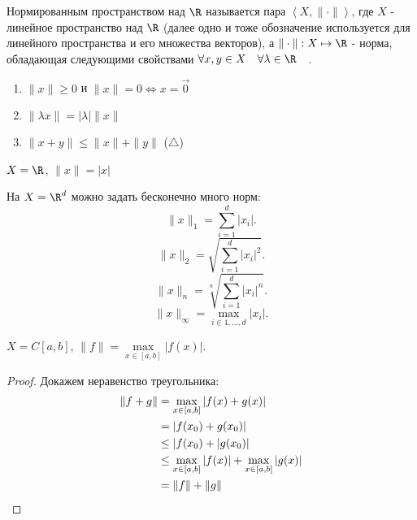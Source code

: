 
\begin{definition} \thmslashn 

    Нормированным пространством над $\R$ называется пара $\left<X, \|\cdot\|\right>$, где $X$ - линейное пространство над $\R$ (далее одно и тоже обозначение используется для линейного пространства и его множества векторов), а $\|\cdot\| : X \mapsto \R$ - норма, обладающая следующими свойствами $\forall{x, y\in X}\quad \forall{\lambda\in \R}\quad $.

    \begin{enumerate}
        \item $\|x\| \ge 0$ и $\|x\| = 0 \iff x = \vec{0}$
        \item $\|\lambda x\| = |\lambda| \|x\|$
        \item $\|x + y\| \le \|x\| + \|y\|$ ($\triangle$)
    \end{enumerate}
\end{definition}
\begin{example} \thmslashn

    $X = \R$,  $\|x\| = |x|$
\end{example}
\begin{example} \thmslashn

    На $X = \R^{d}$ можно задать бесконечно много норм:
    \[ \|x\|_{1} = \sum\limits_{i=1}^{d} |x_{i}| .\]
    \[ \|x\|_{2} = \sqrt{\sum\limits_{i=1}^{d} |x_{i}|^{2}}  .\]
    \[ \|x\|_{n} = \sqrt[n]{\sum\limits_{i=1}^{d} |x_{i}|^{n}}  .\]
    \[ \|x\|_{\infty} = \max\limits_{i\in 1, \ldots, d} |x_{i}| .\] 
\end{example}
\begin{example} \thmslashn

    $X = C[a, b]$,  $\|f\| = \max\limits_{x\in [a, b]} |f(x)|$.

    \begin{proof} \thmslashn
    
        Докажем неравенство треугольника:
        \begin{equation*}
            \begin{split}
                \|f + g\|
                &= \max\limits_{x\in [a, b]} |f(x) + g(x)|\\
                &= |f(x_0) + g(x_0)|\\
                &\le |f(x_0) + |g(x_0)|\\
                &\le \max\limits_{x\in [a, b]} |f(x)| + \max\limits_{x\in [a, b]} |g(x)|\\
                &= \|f\| + \|g\| \qedhere
            \end{split}
        \end{equation*}
    \end{proof}
\end{example}
